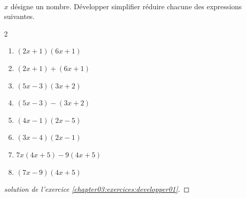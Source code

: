 \documentclass[main.tex]{subfiles}
\begin{document}
\begin{exercise}\label{chapter03:exercices:developper01}\hfill \\
	$x$ désigne un nombre.	Développer simplifier réduire chacune des expressions suivantes.
	\begin{multicols}{2} 
		\begin{enumerate}[label={$\Alph*(x)=$}, leftmargin=*] 
			\item $(2x+1)(6x+1)$
			\item $(2x+1)+(6x+1)$
			\item $(5x-3)(3x+2)$
			\item $(5x-3)-(3x+2)$
			\item $(4x -1)(2x-5)$
			\item $(3x -4)  (2x -1)$
			\item $7x(4x+5)-9(4x+5)$
			\item $(7x-9)(4x+5)$ 
		\end{enumerate}
	\end{multicols}
\end{exercise} 
%	 
\newpage 
\begin{proof}[solution de l'exercice \ref{chapter03:exercices:developper01}]
	
\end{proof}
%	 
\newpage  
{}  
\pagestyle{scrheadings} %
\onehalfspacing 
\end{document}
